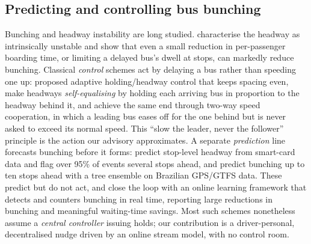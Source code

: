 \documentclass[11pt,a4paper]{article}
\begin{document}
\subsection{Predicting and controlling bus bunching}
\label{sec:rw-bunching}
Bunching and headway instability are long studied. \citet{Enayatollahi2019} characterise the
headway as intrinsically unstable and show that even a small reduction in per-passenger boarding
time, or limiting a delayed bus's dwell at stops, can markedly reduce bunching. Classical
\emph{control} schemes act by delaying a bus rather than speeding one up: \citet{Daganzo2009}
proposed adaptive holding/headway control that keeps spacing even, \citet{Bartholdi2012} make
headways \emph{self-equalising} by holding each arriving bus in proportion to the headway behind
it, and \citet{DaganzoPilachowski2011} achieve the same end through two-way speed cooperation, in
which a leading bus eases off for the one behind but is never asked to exceed its normal speed.
This ``slow the leader, never the follower'' principle is the action our advisory approximates. A
separate \emph{prediction} line forecasts bunching before it forms: \citet{Yu2016} predict
stop-level headway from smart-card data and flag over 95\% of events several stops ahead, and
\citet{BorgesSantos2022} predict bunching up to ten stops ahead with a tree ensemble on Brazilian
GPS/GTFS data. These predict but do not act, and \citet{MoreiraMatias2016} close the loop with an
online learning framework that detects and counters bunching in real time, reporting large
reductions in bunching and meaningful waiting-time savings. Most such schemes nonetheless assume a
\emph{central controller} issuing holds; our contribution is a driver-personal, decentralised
nudge driven by an online stream model, with no control room.
\end{document}
